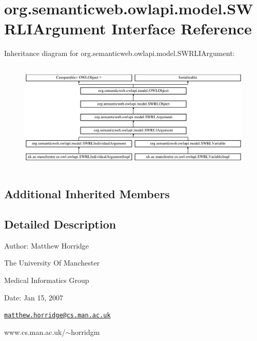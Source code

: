 \hypertarget{interfaceorg_1_1semanticweb_1_1owlapi_1_1model_1_1_s_w_r_l_i_argument}{\section{org.\-semanticweb.\-owlapi.\-model.\-S\-W\-R\-L\-I\-Argument Interface Reference}
\label{interfaceorg_1_1semanticweb_1_1owlapi_1_1model_1_1_s_w_r_l_i_argument}
}
Inheritance diagram for org.\-semanticweb.\-owlapi.\-model.\-S\-W\-R\-L\-I\-Argument\-:\begin{figure}[H]
\begin{center}
\leavevmode
\includegraphics[height=5.326087cm]{interfaceorg_1_1semanticweb_1_1owlapi_1_1model_1_1_s_w_r_l_i_argument}
\end{center}
\end{figure}
\subsection*{Additional Inherited Members}


\subsection{Detailed Description}
Author\-: Matthew Horridge\par
 The University Of Manchester\par
 Medical Informatics Group\par
 Date\-: Jan 15, 2007\par
\par
 

\href{mailto:matthew.horridge@cs.man.ac.uk}{\tt matthew.\-horridge@cs.\-man.\-ac.\-uk}\par
 www.\-cs.\-man.\-ac.\-uk/$\sim$horridgm\par
\par


